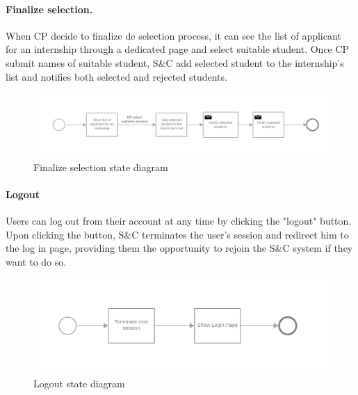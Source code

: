 \paragraph{Finalize selection.}
When CP decide to finalize de selection process, it can see the list of applicant for an internship through a dedicated page and select suitable student.
Once CP submit names of suitable student, S\&C add selected student to the internship's list and notifies both selected and rejected students.

\begin{figure}[H]
    \begin{center}
        \includegraphics[width=1\linewidth]{RASD/LaTeX/Images/StateDiagrams/finalize_selections.png}
        \caption{Finalize selection state diagram}
        \label{fig:finalize_selections_sd}%
    \end{center}
\end{figure}

\paragraph{Logout}
Users can log out from their account at any time by clicking the "logout" button. Upon clicking the button, S\&C terminates the user's session and redirect him to the log in page, providing them the opportunity to rejoin the S\&C system if they want to do so.

\begin{figure}[H]
    \begin{center}
        \includegraphics[width=1\linewidth]{RASD/LaTeX/Images/StateDiagrams/logout.png}
        \caption{Logout state diagram}
        \label{fig:logout_sd}%
    \end{center}
\end{figure}


